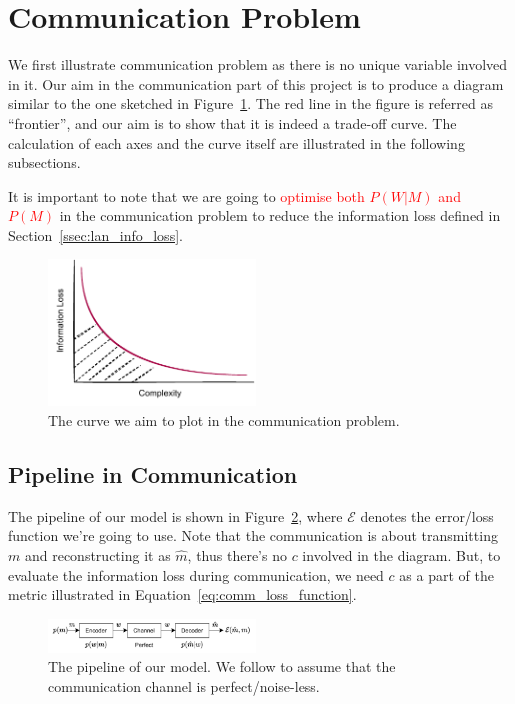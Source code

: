 \documentclass[11pt]{article}
\begin{document}
\section{Communication Problem}
\label{sec:comm}

We first illustrate communication problem as there is no unique variable involved in it.
Our aim in the communication part of this project is to produce a diagram similar to the one sketched in Figure~\ref{fig:curve_comm}.
The red line in the figure is referred as ``frontier'', and our aim is to show that it is indeed a trade-off curve.
The calculation of each axes and the curve itself are illustrated in the following subsections.

It is important to note that we are going to \textcolor{red}{optimise both $P(W|M)$ and $P(M)$} in the communication problem to reduce the information loss defined in Section~\ref{ssec:lan_info_loss}.

\begin{figure}[t]
    \centering
    \includegraphics[width=0.49\textwidth]{docs/intro_rate_distortion/graphs/communication_curve.pdf}
    \caption{The curve we aim to plot in the communication problem.}
    \label{fig:curve_comm}
\end{figure}

\subsection{Pipeline in Communication}
\label{ssec:comm_pipeline}

The pipeline of our model is shown in Figure~\ref{fig:pipeline}, where $\mathcal{E}$ denotes the error/loss function we're going to use.
Note that the communication is about transmitting $m$ and reconstructing it as $\hat{m}$, thus there's no $c$ involved in the diagram.
But, to evaluate the information loss during communication, we need $c$ as a part of the metric illustrated in Equation~\ref{eq:comm_loss_function}.

\begin{figure}[h]
    \centering
    \includegraphics[width=0.49\textwidth]{docs/intro_rate_distortion/graphs/cog_communication.pdf}
    \caption{The pipeline of our model. We follow \citet{zaslavsky2018efficient} to assume that the communication channel is perfect/noise-less.}
    \label{fig:pipeline}
\end{figure}
\end{document}
